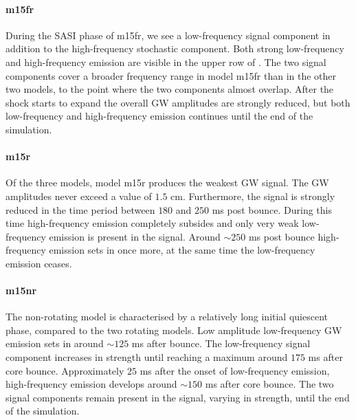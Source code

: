 \paragraph{m15fr}
During the SASI phase of m15fr, we see a low-frequency signal 
component in addition to the high-frequency stochastic component. Both strong low-frequency and high-frequency
emission are visible in the upper row of . The two signal components
cover a broader frequency range in model m15fr than in the other two models, to the point where the two components almost
overlap. After the shock starts to expand the overall GW amplitudes are strongly reduced, but
both low-frequency and high-frequency emission continues until the end of the simulation.

\paragraph{m15r}
Of the three models, model m15r produces the weakest GW signal. The GW amplitudes
never exceed a value of $1.5$ cm. Furthermore, the signal is strongly reduced in the
time period between $180$ and $250$ ms post bounce. During this time high-frequency emission
completely subsides and only very weak low-frequency emission is present in the signal.
Around $\sim 250$ ms post bounce high-frequency emission sets in once more, 
at the same time the low-frequency emission ceases. 

\paragraph{m15nr}
The non-rotating model is characterised by a relatively long initial quiescent phase, compared to the two
rotating models. Low amplitude low-frequency GW emission sets in around $\sim 125$ ms after bounce. The low-frequency
signal component increases in strength until reaching a maximum around $175$ ms after core bounce.
Approximately $25$ ms after the onset of low-frequency emission, high-frequency emission develops around
$\sim 150$ ms after core bounce. The two signal components remain present in the signal, varying in
strength, until the end of the simulation.

